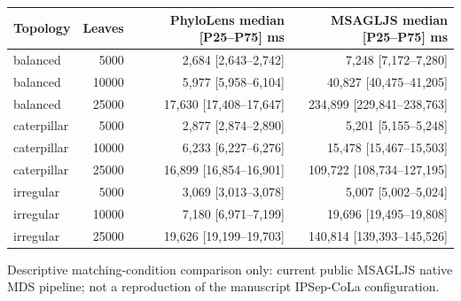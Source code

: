 \begin{tabular}{lrrr}
\hline
Topology & Leaves & PhyloLens median [P25--P75] ms & MSAGLJS median [P25--P75] ms \\
\hline
balanced & 5000 & 2,684 [2,643--2,742] & 7,248 [7,172--7,280] \\
balanced & 10000 & 5,977 [5,958--6,104] & 40,827 [40,475--41,205] \\
balanced & 25000 & 17,630 [17,408--17,647] & 234,899 [229,841--238,763] \\
caterpillar & 5000 & 2,877 [2,874--2,890] & 5,201 [5,155--5,248] \\
caterpillar & 10000 & 6,233 [6,227--6,276] & 15,478 [15,467--15,503] \\
caterpillar & 25000 & 16,899 [16,854--16,901] & 109,722 [108,734--127,195] \\
irregular & 5000 & 3,069 [3,013--3,078] & 5,007 [5,002--5,024] \\
irregular & 10000 & 7,180 [6,971--7,199] & 19,696 [19,495--19,808] \\
irregular & 25000 & 19,626 [19,199--19,703] & 140,814 [139,393--145,526] \\
\hline
\end{tabular}

\par\smallskip
\footnotesize Descriptive matching-condition comparison only: current public MSAGLJS native MDS pipeline; not a reproduction of the manuscript IPSep-CoLa configuration.
